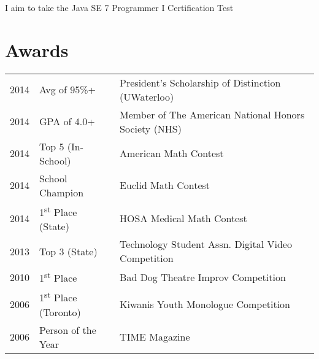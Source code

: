 \documentclass[letterpaper]{deedy-resume} %
\begin{document}
\begin{minipage}[t]{0.66\textwidth}

  \vspace{\topsep} %

  \begin{tightitemize}
  \item I aim to take the Java SE 7 Programmer I Certification Test
  \end{tightitemize}

  \sectionspace %


  \section{Awards} 

  \begin{tabular}{rll}

    2014	 & Avg of 95\%+ & President’s Scholarship of Distinction (UWaterloo)\\
    2014	 & GPA of 4.0+ & Member of The American National Honors Society (NHS) \\
    2014	 & Top 5 (In-School) & American Math Contest\\
    2014	 & School Champion & Euclid Math Contest\\
    2014	 & 1\textsuperscript{st} Place (State) & HOSA Medical Math Contest\\
    2013 	 & Top 3 (State) & Technology Student Assn. Digital Video Competition \\
    2010	 & 1\textsuperscript{st} Place & Bad Dog Theatre Improv Competition \\
    2006	 & 1\textsuperscript{st} Place (Toronto) & Kiwanis Youth Monologue Competition \\
    2006	 & Person of the Year & TIME Magazine \\
  \end{tabular}

  \sectionspace %

\end{minipage} %

\end{document}

